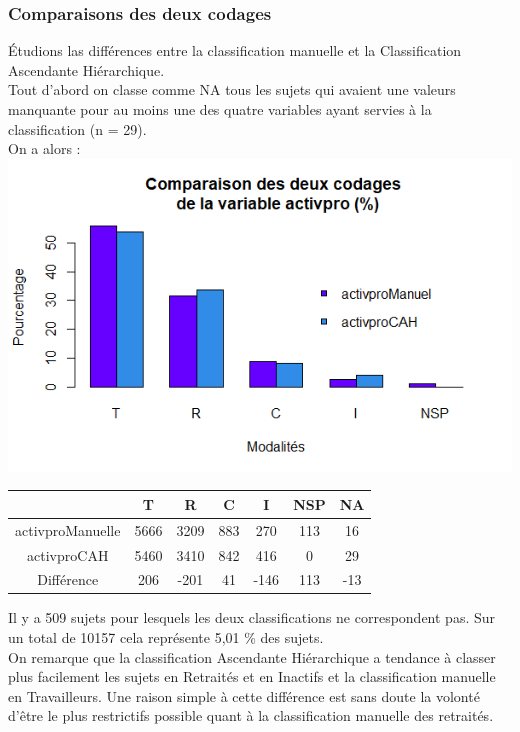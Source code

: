 \documentclass{book}
\begin{document}
\subsubsection{Comparaisons des deux codages}
\noindent
Étudions las différences entre la classification manuelle et la Classification Ascendante Hiérarchique.\\
Tout d'abord on classe comme NA tous les sujets qui avaient une valeurs manquante pour au moins une des quatre variables ayant servies à la classification (n = 29).\\
On a alors : \\

\includegraphics[scale=1]{comp_codages_activpro_pourcentage.png}

\begin{center}
\setlength\arrayrulewidth{.5pt}
\begin{tabular}{c|cccccc}

	& T & R & C & I & NSP & NA \\
	\hline
activproManuelle & 5666 & 3209 & 883 & 270 & 113 & 16 \\
activproCAH	 & 5460 & 3410 &  842 & 416 & 0 & 29 \\
\hline
\hline
Différence & 206 & -201 &  41 & -146& 113& -13
\end{tabular}
\end{center}

\noindent
Il y a 509 sujets pour lesquels les deux classifications ne correspondent pas. Sur un total de 10157 cela représente 5,01 \% des sujets.\\
On remarque que la classification Ascendante Hiérarchique a tendance à classer plus facilement les sujets en Retraités et en Inactifs et la classification manuelle en Travailleurs. Une raison simple à cette différence est sans doute la volonté d'être le plus restrictifs possible quant à la classification manuelle des retraités.
\end{document}
